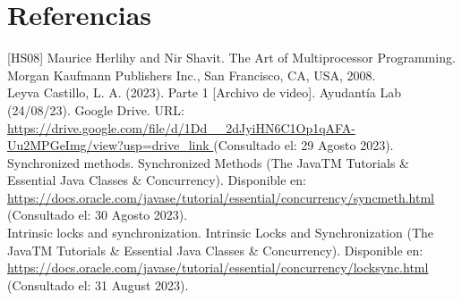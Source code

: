 \documentclass[12pt]{extarticle} %
\begin{document}
\section{Referencias}
[HS08] Maurice Herlihy and Nir Shavit. The Art of Multiprocessor Programming. Morgan Kaufmann Publishers Inc., San Francisco, CA, USA, 2008.\\[2mm]
Leyva Castillo, L. A. (2023). Parte 1 [Archivo de video]. Ayudantía Lab (24/08/23). Google Drive. URL:
\url{ https://drive.google.com/file/d/1Dd__2dJyiHN6C1Op1qAFA-Uu2MPGeImg/view?usp=drive_link } (Consultado el: 29 Agosto 2023).  \\[2mm]
Synchronized methods. Synchronized Methods (The JavaTM Tutorials \& Essential Java Classes \& Concurrency). Disponible en: \url{ https://docs.oracle.com/javase/tutorial/essential/concurrency/syncmeth.html } (Consultado el: 30 Agosto 2023). \\[2mm]
Intrinsic locks and synchronization. Intrinsic Locks and Synchronization (The JavaTM Tutorials \& Essential Java Classes \& Concurrency). Disponible en: 
\url{ https://docs.oracle.com/javase/tutorial/essential/concurrency/locksync.html } (Consultado el: 31 August 2023). 
\end{document}
